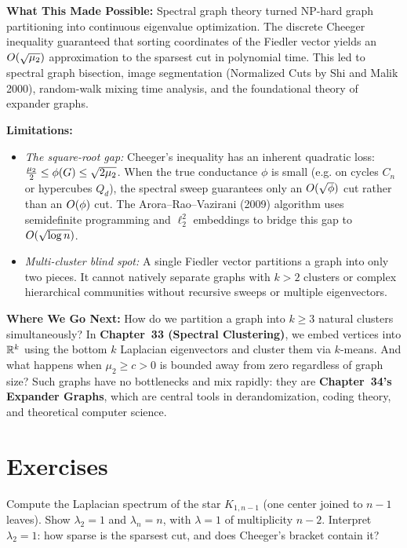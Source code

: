 \begin{connectionbox}
\textbf{What This Made Possible:}
Spectral graph theory turned NP-hard graph partitioning into continuous eigenvalue optimization.
The discrete Cheeger inequality guaranteed that sorting coordinates of the Fiedler vector
yields an $O(\sqrt{\mu_2})$ approximation to the sparsest cut in polynomial time.
This led to spectral graph bisection, image segmentation (Normalized Cuts by Shi and Malik 2000),
random-walk mixing time analysis, and the foundational theory of expander graphs.

\textbf{Limitations:}
\begin{itemize}
  \item \emph{The square-root gap:} Cheeger's inequality has an inherent quadratic loss:
        $\tfrac{\mu_2}{2} \le \phi(G) \le \sqrt{2\mu_2}$. When the true conductance $\phi$ is
        small (e.g. on cycles $C_n$ or hypercubes $Q_d$), the spectral sweep guarantees only
        an $O(\sqrt{\phi})$ cut rather than an $O(\phi)$ cut. The Arora--Rao--Vazirani (2009)
        algorithm uses semidefinite programming and $\ell_2^2$ embeddings to bridge this gap to $O(\sqrt{\log n})$.
  \item \emph{Multi-cluster blind spot:} A single Fiedler vector partitions a graph into only
        two pieces. It cannot natively separate graphs with $k > 2$ clusters or complex hierarchical
        communities without recursive sweeps or multiple eigenvectors.
\end{itemize}

\textbf{Where We Go Next:}
How do we partition a graph into $k \ge 3$ natural clusters simultaneously?
In \textbf{Chapter~33 (Spectral Clustering)}, we embed vertices into $\mathbb{R}^k$ using the bottom $k$
Laplacian eigenvectors and cluster them via $k$-means.
And what happens when $\mu_2 \ge c > 0$ is bounded away from zero regardless of graph size?
Such graphs have no bottlenecks and mix rapidly: they are \textbf{Chapter~34's Expander Graphs},
which are central tools in derandomization, coding theory, and theoretical computer science.
\end{connectionbox}

\section{Exercises}
\label{ch32:exercises}

\begin{exercise}
Compute the Laplacian spectrum of the star $K_{1,n-1}$ (one center joined to $n-1$ leaves). Show $\lambda_2=1$ and $\lambda_n=n$, with $\lambda=1$ of multiplicity $n-2$. Interpret $\lambda_2=1$: how sparse is the sparsest cut, and does Cheeger's bracket contain it?
\end{exercise}


